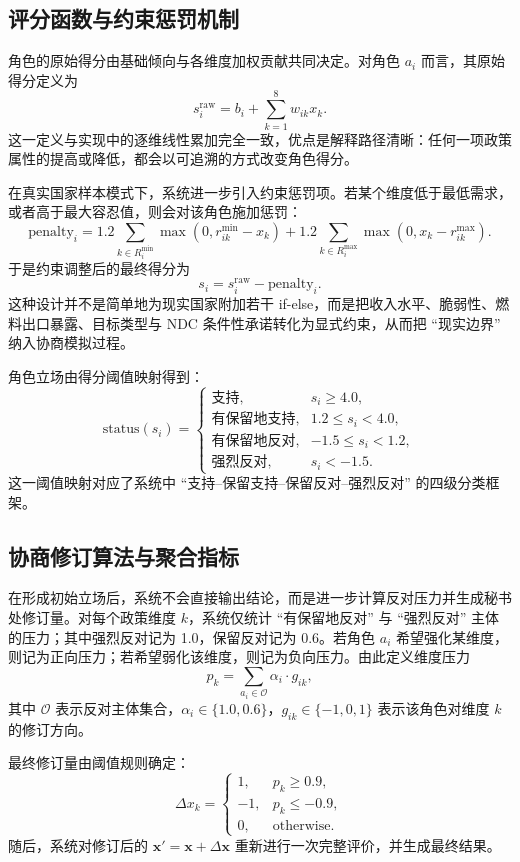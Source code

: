 \documentclass[12pt,a4paper]{ctexart}
\begin{document}
\subsection{评分函数与约束惩罚机制}
角色的原始得分由基础倾向与各维度加权贡献共同决定。对角色 \(a_i\) 而言，其原始得分定义为
\[
s_i^{\mathrm{raw}} = b_i + \sum_{k=1}^{8} w_{ik} x_k .
\]
这一定义与实现中的逐维线性累加完全一致，优点是解释路径清晰：任何一项政策属性的提高或降低，都会以可追溯的方式改变角色得分。

在真实国家样本模式下，系统进一步引入约束惩罚项。若某个维度低于最低需求，或者高于最大容忍值，则会对该角色施加惩罚：
\[
\mathrm{penalty}_i =
1.2 \sum_{k \in R_i^{\min}} \max(0, r_{ik}^{\min} - x_k)
+
1.2 \sum_{k \in R_i^{\max}} \max(0, x_k - r_{ik}^{\max}) .
\]
于是约束调整后的最终得分为
\[
s_i = s_i^{\mathrm{raw}} - \mathrm{penalty}_i .
\]
这种设计并不是简单地为现实国家附加若干 if-else，而是把收入水平、脆弱性、燃料出口暴露、目标类型与 NDC 条件性承诺转化为显式约束，从而把 ``现实边界'' 纳入协商模拟过程。

角色立场由得分阈值映射得到：
\[
\mathrm{status}(s_i)=
\begin{cases}
\text{支持}, & s_i \ge 4.0,\\
\text{有保留地支持}, & 1.2 \le s_i < 4.0,\\
\text{有保留地反对}, & -1.5 \le s_i < 1.2,\\
\text{强烈反对}, & s_i < -1.5.
\end{cases}
\]
这一阈值映射对应了系统中 ``支持--保留支持--保留反对--强烈反对'' 的四级分类框架。

\subsection{协商修订算法与聚合指标}
在形成初始立场后，系统不会直接输出结论，而是进一步计算反对压力并生成秘书处修订量。对每个政策维度 \(k\)，系统仅统计 ``有保留地反对'' 与 ``强烈反对'' 主体的压力；其中强烈反对记为 1.0，保留反对记为 0.6。若角色 \(a_i\) 希望强化某维度，则记为正向压力；若希望弱化该维度，则记为负向压力。由此定义维度压力
\[
p_k = \sum_{a_i \in \mathcal{O}} \alpha_i \cdot g_{ik},
\]
其中 \(\mathcal{O}\) 表示反对主体集合，\(\alpha_i \in \{1.0, 0.6\}\)，\(g_{ik}\in\{-1,0,1\}\) 表示该角色对维度 \(k\) 的修订方向。

最终修订量由阈值规则确定：
\[
\Delta x_k =
\begin{cases}
1, & p_k \ge 0.9,\\
-1, & p_k \le -0.9,\\
0, & \text{otherwise}.
\end{cases}
\]
随后，系统对修订后的 \(\mathbf{x}'=\mathbf{x}+\Delta \mathbf{x}\) 重新进行一次完整评价，并生成最终结果。
\end{document}
